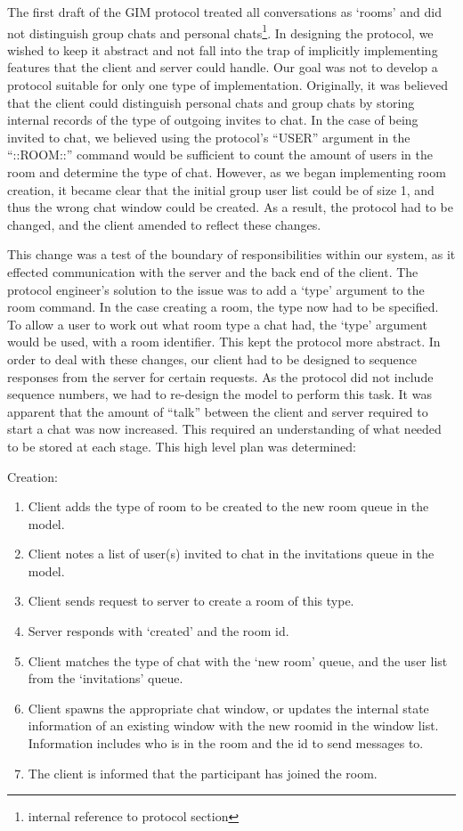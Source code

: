 The first draft of the GIM protocol treated all conversations as `rooms' and did not distinguish group chats and personal chats\footnote{internal reference to protocol section}. In designing the protocol, we wished to keep it abstract and not fall into the trap of implicitly implementing features that the client and server could handle. Our goal was not to develop a protocol suitable for only one type of implementation. Originally, it was believed that the client could distinguish personal chats and group chats by storing internal records of the type of outgoing invites to chat. In the case of being invited to chat, we believed using the protocol's ``USER'' argument in the ``::ROOM::'' command would be sufficient to count the amount of users in the room and determine the type of chat. However, as we began implementing room creation, it became clear that the initial group user list could be of size 1, and thus the wrong chat window could be created. As a result, the protocol had to be changed, and the client amended to reflect these changes. 

This change was a test of the boundary of responsibilities within our system, as it effected communication with the server and the back end of the client. The protocol engineer's solution to the issue was to add a `type' argument to the room command. In the case creating a room, the type now had to be specified. To allow a user to work out what room type a chat had, the `type' argument would be used, with a room identifier. This kept the protocol more abstract. In order to deal with these changes, our client had to be designed to sequence responses from the server for certain requests. As the protocol did not include sequence numbers, we had to re-design the model to perform this task. It was apparent that the amount of ``talk'' between the client and server required to start a chat was now increased. This required an understanding of what needed to be stored at each stage. This high level plan was determined:

Creation:
\begin{enumerate}
\item Client adds the type of room to be created to the new room queue in the model.
\item Client notes a list of user(s) invited to chat in the invitations queue in the model.
\item Client sends request to server to create a room of this type.
\item Server responds with `created' and the room id.
\item Client matches the type of chat with the `new room' queue, and the user list from the `invitations' queue.
\item Client spawns the appropriate chat window, or updates the internal state information of an existing window with the new roomid in the window list. Information includes who is in the room and the id to send messages to.
\item The client is informed that the participant has joined the room.
\end {enumerate}

